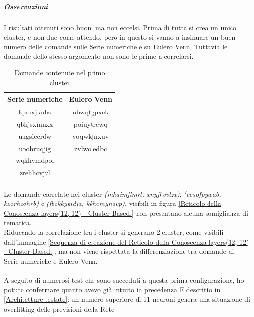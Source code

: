 \subparagraph{Osservazioni}\mbox{}
\noindent
I risultati ottenuti sono buoni ma non eccelsi. Prima di tutto si crea un unico cluster, e non due come attendo, però in questo si vanno a insinuare un buon numero delle domande sulle Serie numeriche e su Eulero Venn. Tuttavia le domande dello stesso argomento non sono le prime a correlarsi.
\begin{longtable}{|c|c|}
	\hline
	\textbf{Serie numeriche} & \textbf{Eulero Venn} \\\hline\hline
	kprsxjkubz & obwqtgpxek \\
	qbhjsxmnxx & poiuytrewq \\
	ungslccrdw & voqwkjnxuv \\ 
	uoohruqjig & zvlwoledbc \\
	wqkhvmdpol & \\
	zrehhcvjvl & \\
\hline
\caption{Domande contenute nel primo cluster}\label{tab:Domande contenute nel primo cluster}
\end{longtable}
\noindent
Le domande correlate nei cluster \textit{(mhaimflmrt, xnyfhvvlzx)}, \textit{(ccsofpywab, kzorhoohrb)} e \textit{(fbekkymdja, kkhcmynavp)}, visibili in figura \ref{Reticolo della Conoscenza layers(12, 12) - Cluster Based.}  non presentano alcuna somiglianza di tematica. \\
Riducendo la correlazione tra i cluster si generano 2 cluster, come visibili dall'immagine \ref{Sequenza di creazione del Reticolo della Conoscenza layers(12, 12) - Cluster Based.}; ma non viene rispettata la differenziazione tra domande di Serie numeriche e Eulero Venn.\\\\
A seguito di numerosi test che sono succeduti a questa prima configurazione, ho potuto confermare quanto avevo gi\`a intuito in precedenza E descritto in \ref{Architetture testate}: un numero superiore di 11 neuroni genera una situazione di overfitting delle previsioni della Rete.

